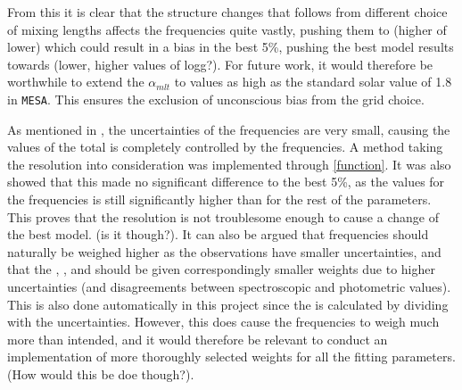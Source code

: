 From this it is clear that the structure changes that follows from different choice of mixing lengths affects the frequencies quite vastly, pushing them to (higher of lower) which could result in a bias in the best 5\%, pushing the best model results towards (lower, higher values of logg?). For future work, it would therefore be worthwhile to extend the $\alpha_{mlt}$ to values as high as the standard solar value of 1.8 in \texttt{MESA}. This ensures the exclusion of unconscious bias from the grid  choice. 
 
As mentioned in , the uncertainties of the frequencies are very small, causing the values of the total \chis is completely controlled by the frequencies. A method taking the resolution into consideration was implemented through \eqref{function}. It was also showed that this made no significant difference to the best 5\%, as the \chis values for the frequencies is still significantly higher than for the rest of the parameters. This proves that the resolution is not troublesome enough to cause a change of the best model. (is it though?). It can also be argued that frequencies should naturally be weighed higher as the observations have smaller uncertainties, and that the \logg, \teff, and \lum should be given correspondingly smaller weights due to higher uncertainties (and disagreements between spectroscopic and photometric values). This is also done automatically in this project since the \chis is calculated by dividing with the uncertainties. However, this does cause the frequencies to weigh much more than intended, and it would therefore be relevant to conduct an implementation of more thoroughly selected weights for all the fitting parameters. (How would this be doe though?). 

